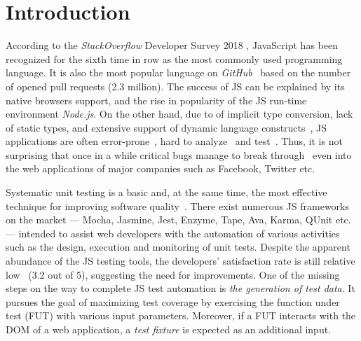 \section{Introduction}
\label{sec.intro}

According to the \emph{StackOverflow} Developer Survey 2018 \cite{stackoverflow2018}, JavaScript has been recognized for the sixth time in row as the most commonly used programming language. It is also the most popular language on \emph{GitHub}~\cite{guthub2017} based on the number of opened pull requests (2.3 million). The success of JS can be explained by its native browsers support, and the rise in popularity of the JS run-time environment \emph{Node.js}. On the other hand, due to of implicit type conversion, lack of static types, and extensive support of dynamic language constructs~\cite{richards2010analysis}, JS applications are often error-prone~\cite{frolin:TSE16}, hard to analyze~\cite{andreasen2017survey, sun2017analysis} and test~\cite{mesbah2015advances}. Thus, it is not surprising that once in a while critical bugs manage to break through~\cite{bugstories2017} even into the web applications of major companies such as Facebook, Twitter etc.

Systematic unit testing is a basic and, at the same time, the most effective technique for improving software quality~\cite{martin2009clean}. There exist numerous JS frameworks on the market --- Mocha, Jasmine, Jest, Enzyme, Tape, Ava, Karma, QUnit etc. --- intended to assist web developers with the automation of various  activities such as the design, execution and monitoring of unit tests. Despite the apparent abundance of the JS testing tools, the developers' satisfaction rate is still relative low~\cite{stateJS2017} (3.2 out of 5), suggesting the need for improvements. One of the missing steps on the way to complete JS test automation is \emph{the generation of test data}. It pursues the goal of maximizing test coverage by exercising the function under test (FUT) with various input parameters. Moreover, if a FUT interacts with the DOM of a web application, a \emph{test fixture} is expected as an additional input.

